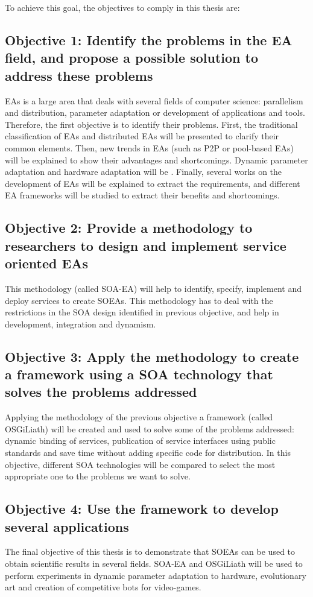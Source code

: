 To achieve this goal, the objectives to comply in this thesis are:

\subsection*{Objective 1: Identify the problems in the EA field, and propose a possible solution to address these problems}
\label{subsec:intro:obj:problems}
EAs is a large area that deals with several fields of computer science: parallelism and distribution, parameter adaptation or development of applications and tools. Therefore, the first objective is to identify their problems. First, the traditional classification of EAs and distributed EAs will be presented to clarify their common elements. Then, new trends in EAs (such as P2P or pool-based EAs) will be explained to show their advantages and shortcomings. Dynamic parameter adaptation and hardware adaptation will be . Finally, several works on the development of EAs will be explained to extract the requirements, and different EA frameworks will be studied to extract their benefits and shortcomings.

\subsection*{Objective 2: Provide a methodology to researchers to design and implement service oriented EAs} 
\label{subsec:intro:obj:methodology}
This methodology (called SOA-EA) will help to identify, specify, implement and deploy services to create SOEAs. This methodology has to deal with the restrictions in the SOA design identified in previous objective, and help in development, integration and dynamism.

\subsection*{Objective 3: Apply the methodology to create a framework using a SOA technology that solves the problems addressed}
\label{subsec:intro:obj:fwork}
Applying the methodology of the previous objective a framework (called OSGiLiath) will be created and used to solve some of the problems addressed: dynamic binding of services, publication of service interfaces using public standards and save time without adding specific code for distribution. In this objective, different SOA technologies will be compared to select the most appropriate one to the problems we want to solve.

\subsection*{Objective 4: Use the framework to develop several applications}
\label{subsec:intro:obj:applications}
The final objective of this thesis is to demonstrate that SOEAs can be used to obtain scientific results in several fields. SOA-EA and OSGiLiath will be used to perform experiments in dynamic parameter adaptation to hardware, evolutionary art and creation of competitive bots for video-games.



